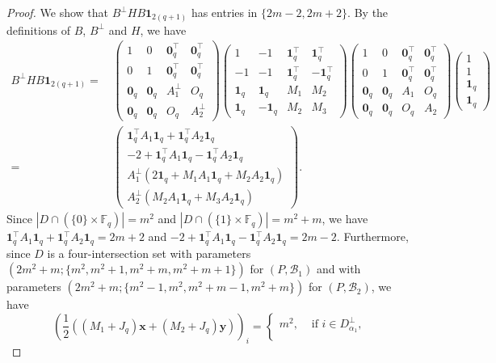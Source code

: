 \documentclass[ALCO,ThmDefs,Unicode]{cedram}
\newcommand*\F{{\mathbb F}}
\newcommand*\tra{\top}
\newcommand*{\un}{\mathbf{1}}
\newcommand*{\bfx}{\mathbf{x}}
\newcommand*{\bfy}{\mathbf{y}}
\newcommand*{\bfo}{\mathbf{0}}
\begin{document}
\begin{proof}
We show that $B^\perp H B\un_{2(q+1)}$ has entries in $\{2m-2,2m+2\}$. By the definitions of $B$, $B^\perp$ and $H$, we have
\begin{align*}
B^\perp H B\un_{2(q+1)}=&\,
\begin{pmatrix} 1 &0 & \bfo_q^\tra& \bfo_q^\tra \\
0 &1 & \bfo_q^\tra& \bfo_q^\tra \\
\bfo_q &\bfo_q & A_1^\perp& O_q \\
\bfo_q & \bfo_q &O_q& A_2^\perp
\end{pmatrix}
\begin{pmatrix}
1 &-1 & \un_q^\tra& \un_q^\tra \\
-1 & -1 & \un_q^\tra&-\un_q^\tra \\
\un_q & \un_q &M_1 & M_2 \\
\un_q & -\un_q&M_2 & M_3
\end{pmatrix}
\begin{pmatrix} 1 &0 & \bfo_q^\tra& \bfo_q^\tra \\
0 &1 & \bfo_q^\tra& \bfo_q^\tra \\
\bfo_q &\bfo_q & A_1& O_q \\
\bfo_q & \bfo_q &O_q& A_2
\end{pmatrix}
\begin{pmatrix} 1\\1\\\un_q \\ \un_q
\end{pmatrix}\\
=&\,
\begin{pmatrix}
\un_q^\tra A_1 \un_q +\un_q^\tra A_2 \un_q\\
-2+\un_q^\tra A_1 \un_q -\un_q^\tra A_2 \un_q\\
A_1^\perp (2\un_q+M_1A_1\un_q+M_2A_2\un_q)\\
A_2^\perp (M_2A_1\un_q+M_3A_2\un_q)
\end{pmatrix}.
\end{align*}
Since $|D\cap (\{0\}\times \F_q)|=m^2$ and $|D\cap (\{1\}\times \F_q)|=m^2+m$, we have $\un_q^\tra A_1 \un_q +\un_q^\tra A_2 \un_q=2m+2$ and $-2+\un_q^\tra A_1 \un_q -\un_q^\tra A_2 \un_q=2m-2$. Furthermore, since $D$ is a four-intersection set with parameters $(2m^2+m;\{m^2,m^2+1,m^2+m,m^2+m+1\})$ for $(P,{\mathcal B}_1)$ and with parameters $(2m^2+m;\{m^2-1,m^2,m^2+m-1,m^2+m\})$ for $(P,{\mathcal B}_2)$, we have
\[
\left(\frac{1}{2}((M_1+J_q)\bfx+(M_2+J_q)\bfy)\right)_i=
\begin{cases}
m^2,& \text{ if } i\in D_{\alpha_1}^\perp,\\

\end{cases}\]
\end{proof}
\end{document}
